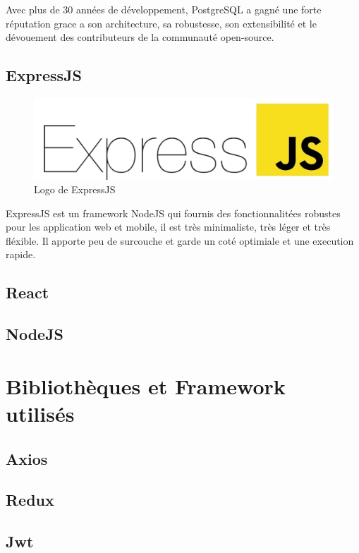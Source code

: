     Avec plus de 30 années de développement, PostgreSQL a gagné une forte réputation grace a son architecture, sa robustesse, son extensibilité et le dévouement des contributeurs de la communauté open-source.\\

    \subsection{ExpressJS\cite{expressjs}}
    \begin{figure}[H]
        \centering
        \includegraphics[scale=0.16]{ACR/ExpressJS-logo.png}
        \caption{Logo de ExpressJS}
    \end{figure}
    
    ExpressJS est un framework NodeJS qui fournis des fonctionnalitées robustes pour les application web et mobile, il est très minimaliste, très léger et très fléxible. Il apporte peu de surcouche et garde un coté optimiale et une execution rapide.

    \subsection{React}
    \subsection{NodeJS}

\section{Bibliothèques et Framework utilisés}
    \subsection{Axios}
    \subsection{Redux}
    \subsection{Jwt}
